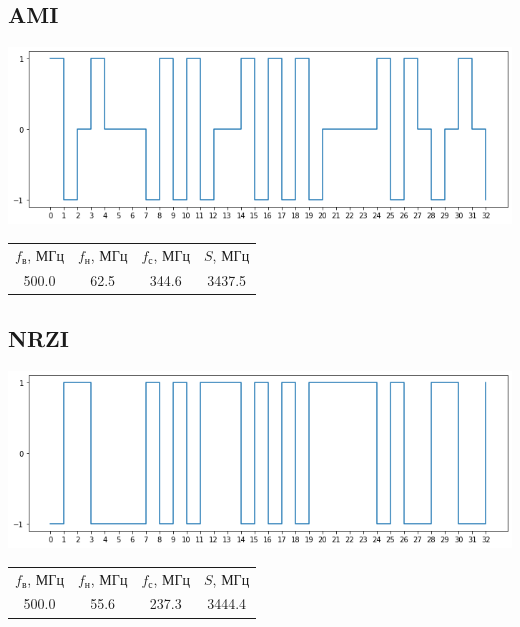 \subsection{AMI}
\includegraphics[width=\textwidth]{1ami}
\begin{center}
    \begin{tabular}{cccc}
        $f_\mathrm{\text{в}}$, МГц & $f_\mathrm{\text{н}}$, МГц & $f_\mathrm{\text{с}}$, МГц & $S$, МГц \\
        500.0 & 62.5 & 344.6 & 3437.5 \\
    \end{tabular}
\end{center}

\subsection{NRZI}
\includegraphics[width=\textwidth]{1nrzi}
\begin{center}
    \begin{tabular}{cccc}
        $f_\mathrm{\text{в}}$, МГц & $f_\mathrm{\text{н}}$, МГц & $f_\mathrm{\text{с}}$, МГц & $S$, МГц \\
        500.0 & 55.6 & 237.3 & 3444.4 \\
    \end{tabular}
\end{center}

